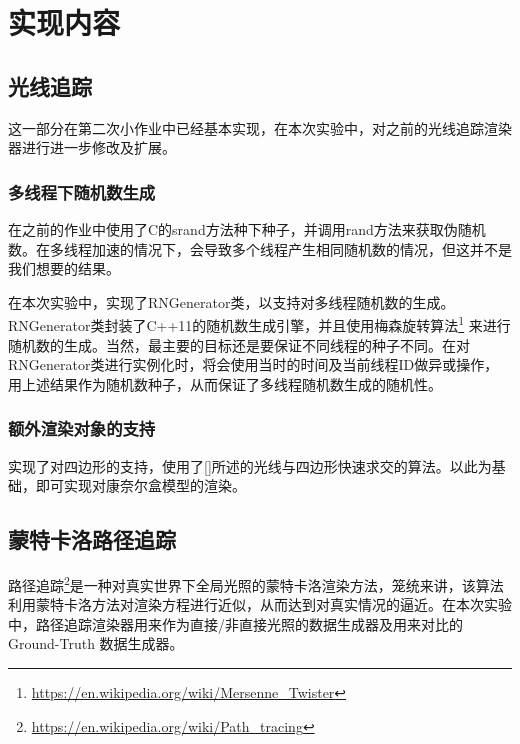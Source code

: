 \section {实现内容}
\subsection {光线追踪}
这一部分在第二次小作业中已经基本实现，在本次实验中，对之前的光线追踪渲染器进行进一步修改及扩展。

\subsubsection {多线程下随机数生成}
在之前的作业中使用了C的srand方法种下种子，并调用rand方法来获取伪随机数。在多线程加速的情况下，会导致多个线程产生相同随机数的情况，但这并不是我们想要的结果。

在本次实验中，实现了RNGenerator类，以支持对多线程随机数的生成。RNGenerator类封装了C++11的随机数生成引擎，并且使用梅森旋转算法\footnote{\url{https://en.wikipedia.org/wiki/Mersenne_Twister}} 来进行随机数的生成。当然，最主要的目标还是要保证不同线程的种子不同。在对RNGenerator类进行实例化时，将会使用当时的时间及当前线程ID做异或操作，用上述结果作为随机数种子，从而保证了多线程随机数生成的随机性。

\subsubsection {额外渲染对象的支持}
实现了对四边形的支持，使用了[\cite{lagae2005efficient}]所述的光线与四边形快速求交的算法。以此为基础，即可实现对康奈尔盒模型的渲染。

\subsection {蒙特卡洛路径追踪}
路径追踪\footnote{\url{https://en.wikipedia.org/wiki/Path_tracing}}是一种对真实世界下全局光照的蒙特卡洛渲染方法，笼统来讲，该算法利用蒙特卡洛方法对渲染方程进行近似，从而达到对真实情况的逼近。在本次实验中，路径追踪渲染器用来作为直接/非直接光照的数据生成器及用来对比的Ground-Truth 数据生成器。

